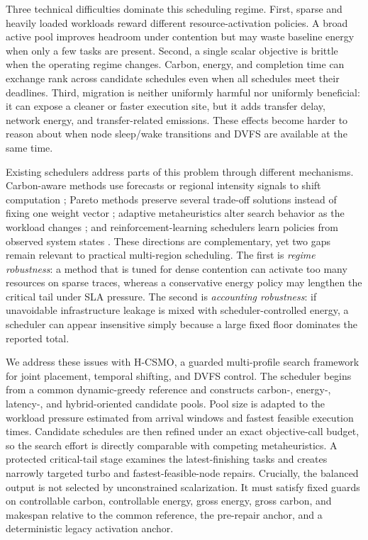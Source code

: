 \documentclass[preprint,12pt]{elsarticle}
\newcommand{\method}{H-CSMO\xspace}
\begin{document}
Three technical difficulties dominate this scheduling regime. First, sparse and heavily loaded workloads reward different resource-activation policies. A broad active pool improves headroom under contention but may waste baseline energy when only a few tasks are present. Second, a single scalar objective is brittle when the operating regime changes. Carbon, energy, and completion time can exchange rank across candidate schedules even when all schedules meet their deadlines. Third, migration is neither uniformly harmful nor uniformly beneficial: it can expose a cleaner or faster execution site, but it adds transfer delay, network energy, and transfer-related emissions. These effects become harder to reason about when node sleep/wake transitions and DVFS are available at the same time.

Existing schedulers address parts of this problem through different mechanisms. Carbon-aware methods use forecasts or regional intensity signals to shift computation \cite{zhai2024edge,zhai2025forecast,calavaro2026functionvariants}; Pareto methods preserve several trade-off solutions instead of fixing one weight vector \cite{abraham2025multi,Etheredge2026Pulse}; adaptive metaheuristics alter search behavior as the workload changes \cite{satouf2025metaheuristic,tandon2025novel}; and reinforcement-learning schedulers learn policies from observed system states \cite{shen2025reinforcement,anand2025eadrl,nasir2026relto,sravan2026drl}. These directions are complementary, yet two gaps remain relevant to practical multi-region scheduling. The first is \emph{regime robustness}: a method that is tuned for dense contention can activate too many resources on sparse traces, whereas a conservative energy policy may lengthen the critical tail under SLA pressure. The second is \emph{accounting robustness}: if unavoidable infrastructure leakage is mixed with scheduler-controlled energy, a scheduler can appear insensitive simply because a large fixed floor dominates the reported total.

We address these issues with \method, a guarded multi-profile search framework for joint placement, temporal shifting, and DVFS control. The scheduler begins from a common dynamic-greedy reference and constructs carbon-, energy-, latency-, and hybrid-oriented candidate pools. Pool size is adapted to the workload pressure estimated from arrival windows and fastest feasible execution times. Candidate schedules are then refined under an exact objective-call budget, so the search effort is directly comparable with competing metaheuristics. A protected critical-tail stage examines the latest-finishing tasks and creates narrowly targeted turbo and fastest-feasible-node repairs. Crucially, the balanced output is not selected by unconstrained scalarization. It must satisfy fixed guards on controllable carbon, controllable energy, gross energy, gross carbon, and makespan relative to the common reference, the pre-repair anchor, and a deterministic legacy activation anchor.
\end{document}
